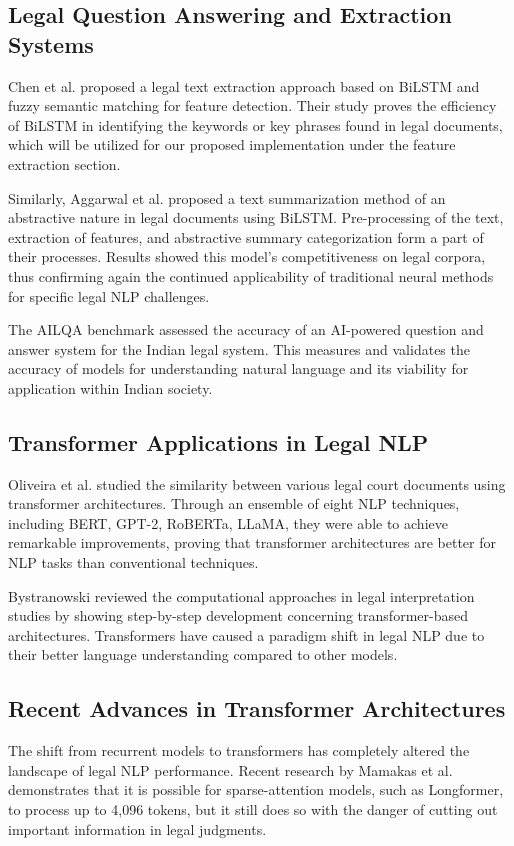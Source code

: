 \documentclass[conference]{IEEEtran}
\begin{document}
\subsection{Legal Question Answering and Extraction Systems}
Chen et al. \cite{chen2025bilstm} proposed a legal text extraction approach based on BiLSTM and fuzzy semantic matching for feature detection. Their study proves the efficiency of BiLSTM in identifying the keywords or key phrases found in legal documents, which will be utilized for our proposed implementation under the feature extraction section.

Similarly, Aggarwal et al. \cite{aggarwal2025abstractive} proposed a text summarization method of an abstractive nature in legal documents using BiLSTM. Pre-processing of the text, extraction of features, and abstractive summary categorization form a part of their processes. Results showed this model's competitiveness on legal corpora, thus confirming again the continued applicability of traditional neural methods for specific legal NLP challenges.

The AILQA benchmark \cite{ailqa2024} assessed the accuracy of an AI-powered question and answer system for the Indian legal system. This measures and validates the accuracy of models for understanding natural language and its viability for application within Indian society.

\subsection{Transformer Applications in Legal NLP}
Oliveira et al. \cite{oliveira2025similarity} studied the similarity between various legal court documents using transformer architectures. Through an ensemble of eight NLP techniques, including BERT, GPT-2, RoBERTa, LLaMA, they were able to achieve remarkable improvements, proving that transformer architectures are better for NLP tasks than conventional techniques.

Bystranowski \cite{bystranowski2025computational} reviewed the computational approaches in legal interpretation studies by showing step-by-step development concerning transformer-based architectures. Transformers have caused a paradigm shift in legal NLP due to their better language understanding compared to other models.

\subsection{Recent Advances in Transformer Architectures}
The shift from recurrent models to transformers has completely altered the landscape of legal NLP performance. Recent research by Mamakas et al. \cite{mamakas2025processing} demonstrates that it is possible for sparse-attention models, such as Longformer, to process up to 4,096 tokens, but it still does so with the danger of cutting out important information in legal judgments.
\end{document}
